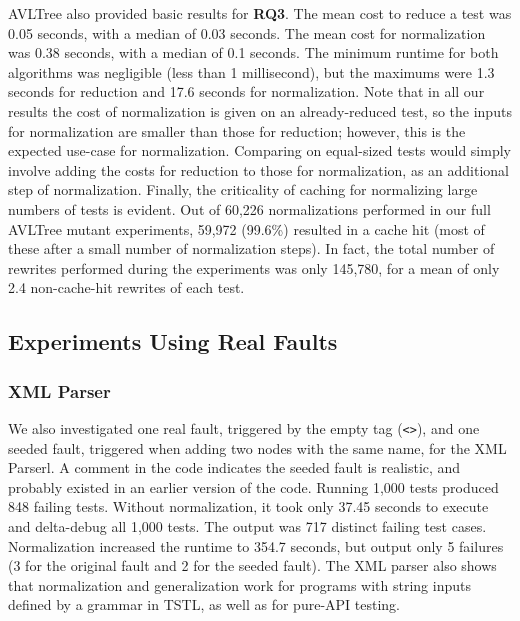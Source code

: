 {AVLTree also provided basic results for {\bf RQ3}. The mean cost to reduce a
test was 0.05 seconds, with a median of 0.03 seconds.  The mean
cost for normalization was 0.38 seconds, with a median of 0.1 seconds.
The minimum runtime for both algorithms was negligible (less than 1
millisecond), but the maximums were 1.3 seconds for reduction and 17.6
seconds for normalization.  Note that in all our results the cost of
normalization is given on an already-reduced test, so the inputs
for normalization are smaller than those for reduction; however, this
is the expected use-case for normalization.  Comparing on equal-sized
tests would simply involve adding the costs for reduction to those for
normalization, as an additional step of normalization.  Finally, the
criticality of caching for normalizing large numbers of tests is
evident.  Out of 60,226 normalizations performed in our full AVLTree mutant
experiments, 59,972 (99.6\%) resulted in a cache hit (most of these
after a small number of normalization steps).  In fact, the total
number of rewrites performed during the experiments was only 145,780,
for a mean of only 2.4 non-cache-hit rewrites of each test.

}

\subsection{Experiments Using Real Faults}

\subsubsection{XML Parser}

We also investigated one
real fault, triggered by the empty tag ({\tt <>}), and one
seeded fault, triggered when adding two nodes with the same
name, for the XML Parserl.  A comment in the code indicates the seeded fault is realistic,
and probably existed in an earlier version of the code.  Running 1,000 tests
produced 848 failing tests.  Without normalization, it took only
37.45 seconds to execute and delta-debug all 1,000 tests.  The output was 717 distinct failing test
cases.  Normalization increased the runtime to 354.7 seconds, but
output only 5 failures (3 for the original fault and 2 for the seeded
fault).  The XML parser also shows that normalization and generalization work for
programs with string inputs defined by a grammar in TSTL, as well
as for pure-API testing.


